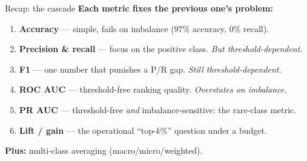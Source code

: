\documentclass[aspectratio=169]{beamer}
\begin{document}
\begin{frame}{Recap: the cascade}
  \textbf{Each metric fixes the previous one's problem:}
  \begin{enumerate}\small
    \item \textbf{Accuracy} --- simple, fails on imbalance ($97\%$ accuracy, $0\%$ recall).
    \item \textbf{Precision \& recall} --- focus on the positive class. \emph{But threshold-dependent.}
    \item \textbf{F1} --- one number that punishes a P/R gap. \emph{Still threshold-dependent.}
    \item \textbf{ROC AUC} --- threshold-free ranking quality. \emph{Overstates on imbalance.}
    \item \textbf{PR AUC} --- threshold-free \emph{and} imbalance-sensitive: the rare-class metric.
    \item \textbf{Lift / gain} --- the operational ``top-$k$\%'' question under a budget.
  \end{enumerate}
  \vskip 4pt
  \textbf{Plus:} multi-class averaging (macro/micro/weighted).
  \vfill
\end{frame}
\end{document}
